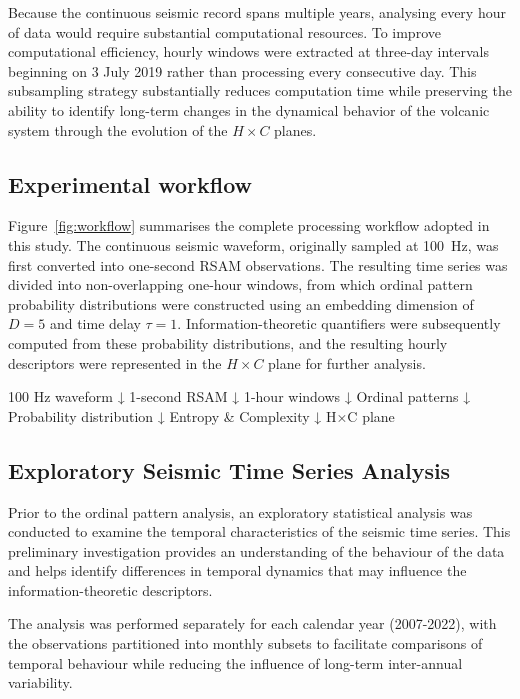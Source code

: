 \documentclass[12pt,a4paper]{article}
\begin{document}
Because the continuous seismic record spans multiple years, analysing every hour of data would require substantial computational resources. To improve computational efficiency, hourly windows were extracted at three-day intervals beginning on 3 July 2019 rather than processing every consecutive day. This subsampling strategy substantially reduces computation time while preserving the ability to identify long-term changes in the dynamical behavior of the volcanic system through the evolution of the $H \times C$ planes.

\subsection{Experimental workflow}
Figure~\ref{fig:workflow} summarises the complete processing workflow adopted in this study. The continuous seismic waveform, originally sampled at \SI{100}{\hertz}, was first converted into one-second RSAM observations. The resulting time series was divided into non-overlapping one-hour windows, from which ordinal pattern probability distributions were constructed using an embedding dimension of $D=5$ and time delay $\tau=1$. Information-theoretic quantifiers were subsequently computed from these probability distributions, and the resulting hourly descriptors were represented in the $H \times C$ plane for further analysis.

100 Hz waveform
↓
1-second RSAM
↓
1-hour windows
↓
Ordinal patterns
↓
Probability distribution
↓
Entropy \& Complexity
↓
H×C plane

\subsection{Exploratory Seismic Time Series Analysis}\label{exploratory_analysis}
Prior to the ordinal pattern analysis, an exploratory statistical analysis was conducted to examine the temporal characteristics of the seismic time series. This preliminary investigation provides an understanding of the behaviour of the data and helps identify differences in temporal dynamics that may influence the information-theoretic descriptors.

The analysis was performed separately for each calendar year (2007-2022), with the observations partitioned into monthly subsets to facilitate comparisons of temporal behaviour while reducing the influence of long-term inter-annual variability.
\end{document}
